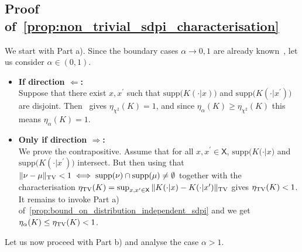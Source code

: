 \documentclass[conference,letterpaper]{IEEEtran}
\def \X{\mathsf X}
\def \supp {\mathrm{supp}}
\begin{document}
\subsection{Proof of~\cref{prop:non_trivial_sdpi_characterisation}}\label{appendix:proof_non_trivial_sdpi_characterisation}\noindent
    We start with Part a). Since the boundary cases $\alpha\to0,1$ are already known~\cite{cohen1993relative}, let us consider $\alpha\in(0,1)$. 
    \begin{itemize}
        \item \textbf{If direction $\Longleftarrow$:}\\Suppose that there exist $x, x^\prime$ such that $\supp\big(K(\cdot|x)\big)$ and $\supp\big(K(\cdot|x^\prime)\big)$ are disjoint. Then~\cite[Theorem 4.1]{cohen1993relative} gives $\eta_{\chi^2}(K)=1$, and since $\eta_\alpha(K)\geq\eta_{\chi^2}(K)$ this means $\eta_\alpha(K)=1$.
        \item \textbf{Only if direction $\Longrightarrow$:}\\We prove the contrapositive. Assume that for all $x, x^\prime\in\X$, $\supp\big(K(\cdot|x\big)$ and $\supp\big(K(\cdot|x^\prime)\big)$ intersect. But then using that $\|\nu-\mu\|_{\rm TV}<1\iff \supp(\nu)\cap\supp(\mu)\neq\emptyset$ together with the characterisation ${\eta_{\rm TV}(K) = \sup_{x, x^\prime\in\X}\|K(\cdot|x)-K(\cdot|x^\prime)\|_{\rm TV}}$ gives $\eta_{\rm TV}(K)<1$. It remains to invoke Part a) of~\cref{prop:bound_on_distribution_independent_sdpi} and we get $\eta_\alpha(K)\leq\eta_{\rm TV}(K)<1$.
    \end{itemize}
    Let us now proceed with Part b) and analyse the case $\alpha>1$.
\end{document}
